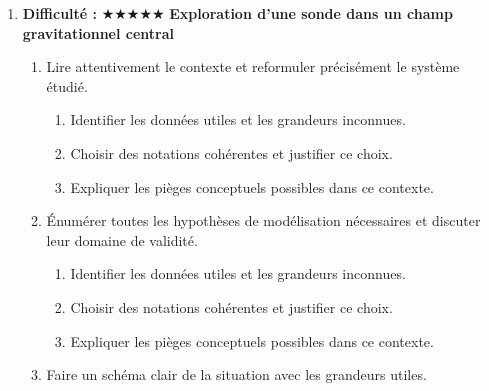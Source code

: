 \documentclass[11pt,a4paper]{article}
\newcommand{\etoiles}[1]{\textbf{Difficulté : }#1}
\begin{document}
\begin{enumerate}[label=\textbf{Très long \arabic*.},leftmargin=*]
\begin{enumerate}[label=\textbf{\arabic*)}]
\begin{enumerate}[label=\alph*)]
\item Comparer au moins deux scénarios différents.
\item Discuter la robustesse du résultat face à une variation de paramètre.
\item Proposer une ouverture vers une situation réelle plus complexe.
\end{enumerate}
\item Rédiger une conclusion scientifique : résultats, limites, prolongements vers la Terminale ou au-delà.
\begin{enumerate}[label=\alph*)]
\item Comparer au moins deux scénarios différents.
\item Discuter la robustesse du résultat face à une variation de paramètre.
\item Proposer une ouverture vers une situation réelle plus complexe.
\end{enumerate}
\end{enumerate}
\item \etoiles{★★★★★}
\textbf{Exploration d'une sonde dans un champ gravitationnel central}
\begin{enumerate}[label=\textbf{\arabic*)}]
\item Lire attentivement le contexte et reformuler précisément le système étudié.
\begin{enumerate}[label=\alph*)]
\item Identifier les données utiles et les grandeurs inconnues.
\item Choisir des notations cohérentes et justifier ce choix.
\item Expliquer les pièges conceptuels possibles dans ce contexte.
\end{enumerate}
\item Énumérer toutes les hypothèses de modélisation nécessaires et discuter leur domaine de validité.
\begin{enumerate}[label=\alph*)]
\item Identifier les données utiles et les grandeurs inconnues.
\item Choisir des notations cohérentes et justifier ce choix.
\item Expliquer les pièges conceptuels possibles dans ce contexte.
\end{enumerate}
\item Faire un schéma clair de la situation avec les grandeurs utiles.
\begin{enumerate}[label=\alph*)]

\end{enumerate}
\end{enumerate}
\end{enumerate}
\end{document}
